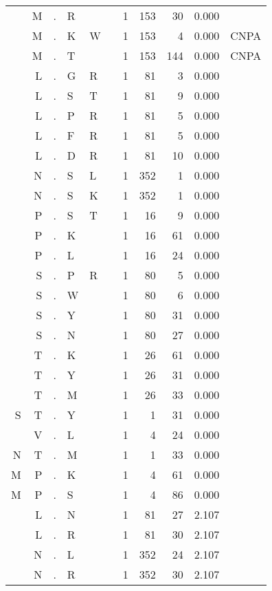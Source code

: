 \begin{longtable}{r@{ } r@{ } c@{ } l@{ } l@{ } l@{ } r r r r l }
  & M & . & R &   &   & 1 & 153 & 30 & 0.000 &  \\
  & M & . & K & W &   & 1 & 153 & 4 & 0.000 & \textsc{CNPA} \\
  & M & . & T &   &   & 1 & 153 & 144 & 0.000 & \textsc{CNPA} \\
  & L & . & G & R &   & 1 & 81 & 3 & 0.000 &  \\
  & L & . & S & T &   & 1 & 81 & 9 & 0.000 &  \\
  & L & . & P & R &   & 1 & 81 & 5 & 0.000 &  \\
  & L & . & F & R &   & 1 & 81 & 5 & 0.000 &  \\
  & L & . & D & R &   & 1 & 81 & 10 & 0.000 &  \\
  & N & . & S & L &   & 1 & 352 & 1 & 0.000 &  \\
  & N & . & S & K &   & 1 & 352 & 1 & 0.000 &  \\
  & P & . & S & T &   & 1 & 16 & 9 & 0.000 &  \\
  & P & . & K &   &   & 1 & 16 & 61 & 0.000 &  \\
  & P & . & L &   &   & 1 & 16 & 24 & 0.000 &  \\
  & S & . & P & R &   & 1 & 80 & 5 & 0.000 &  \\
  & S & . & W &   &   & 1 & 80 & 6 & 0.000 &  \\
  & S & . & Y &   &   & 1 & 80 & 31 & 0.000 &  \\
  & S & . & N &   &   & 1 & 80 & 27 & 0.000 &  \\
  & T & . & K &   &   & 1 & 26 & 61 & 0.000 &  \\
  & T & . & Y &   &   & 1 & 26 & 31 & 0.000 &  \\
  & T & . & M &   &   & 1 & 26 & 33 & 0.000 &  \\
S & T & . & Y &   &   & 1 & 1 & 31 & 0.000 &  \\
  & V & . & L &   &   & 1 & 4 & 24 & 0.000 &  \\
N & T & . & M &   &   & 1 & 1 & 33 & 0.000 &  \\
M & P & . & K &   &   & 1 & 4 & 61 & 0.000 &  \\
M & P & . & S &   &   & 1 & 4 & 86 & 0.000 &  \\
  & L & . & N &   &   & 1 & 81 & 27 & 2.107 &  \\
  & L & . & R &   &   & 1 & 81 & 30 & 2.107 &  \\
  & N & . & L &   &   & 1 & 352 & 24 & 2.107 &  \\
  & N & . & R &   &   & 1 & 352 & 30 & 2.107 &  \\

\end{longtable}
